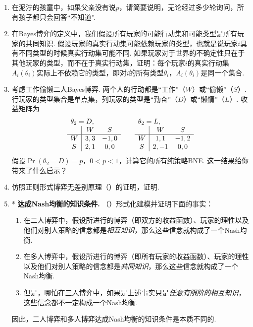 \begin{enumerate}[wide, labelindent=0pt]
    \item \label{exercise:muddy-children-no-p} 在泥泞的孩童中，如果父亲没有说$p$，请简要说明，无论经过多少轮询问，所有孩子都只会回答“不知道”.
    
    \item 在Bayes博弈的定义中，我们假设所有玩家的可能行动集和可能类型是所有玩家的共同知识. 假设玩家的真实行动集可能依赖玩家的类型，也就是说玩家$i$具有不同类型的时候真实行动集可能不同. 如果玩家对于世界的不确定性只在于其他玩家的类型，而不在于真实行动集，证明：每个玩家$i$的真实行动集$A_i(\theta_i)$实际上不依赖它的类型，即对$i$的所有类型$\theta_i$，$A_i(\theta_i)$是同一个集合.

    \item 考虑工作偷懒二人Bayes博弈. 两个人的行动都是“工作”（$W$）或“偷懒”（$S$）. 行玩家的类型集合是单点集，列玩家的类型是“勤奋”（$D$）或“懒惰”（$L$）. 收益矩阵为
    \[\begin{array}{c|cc}
        \multicolumn{3}{l}{\theta_2=D,}\\
         &W&S  \\\hline
         W&3,3&-1,0\\
         S&2,1&0,0\\
    \end{array}\qquad \begin{array}{c|cc}
        \multicolumn{3}{l}{\theta_2=L,}\\
         &W&S  \\\hline
         W&1,1&-1,2\\
         S&2,-1&0,0\\
    \end{array}\]
    假设$\Pr(\theta_2=D)=p$，$0<p<1$，计算它的所有纯策略BNE. 这一结果给你带来了什么启示？

    \item \label{exercise:exante-expost-equivalence} 仿照正则形式博弈无差别原理（）的证明，证明.

    \item *\label{exercise:Aumann-NE-common-knowledge} \textbf{达成Nash均衡的知识条件. }（\cite{aumannEpistemicConditionsNash1995}）形式化建模并证明下面的事实：
    \begin{enumerate}
        \item 在二人博弈中，假设所进行的博弈（即双方的收益函数）、玩家的理性以及他们对别人策略的信念都是\textit{相互知识}，那么这些信念就构成了一个Nash均衡. 
        \item 在多人博弈中，假设所进行的博弈（即所有玩家的收益函数）、玩家的理性以及他们对别人策略的信念都是\textit{共同知识}，那么这些信念就构成了一个Nash均衡. 
        \item 但是，哪怕在三人博弈中，如果是上述事实只是\textit{任意有限阶的相互知识}，这些信念都不一定构成一个Nash均衡.
    \end{enumerate}
    因此，二人博弈和多人博弈达成Nash均衡的知识条件是本质不同的.


\end{enumerate}
